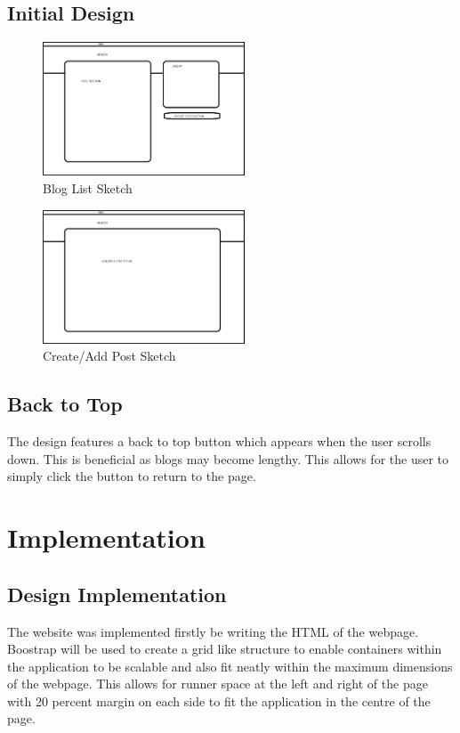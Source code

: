 \documentclass[10pt, a4paper]{article}
\begin{document}
	\subsection{Initial Design}
	\begin{figure}[H]
  	  \centering
   	 \includegraphics[width=60mm]{images/sketch.png}
    	\caption{Blog List Sketch}
    \end{figure}
	\begin{figure}[H]
  	  \centering
   	 \includegraphics[width=60mm]{images/en_sketch.png}
    	\caption{Create/Add Post Sketch}
    \end{figure}
\subsection{Back to Top}
The design features a back to top button which appears when the user scrolls down. This is beneficial as blogs may become lengthy. This allows for the user to simply click the button to return to the page. 
	\section{Implementation}
	\subsection{Design Implementation}
	The website was implemented firstly be writing the HTML of the webpage. Boostrap will be used to create a grid like structure to enable containers within the application to be scalable and also fit neatly within the maximum dimensions of the webpage. This allows for runner space at the left and right of the page with 20 percent margin on each side to fit the application in the centre of the page. 
  
\end{document}
